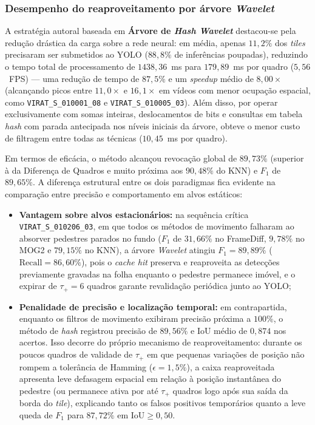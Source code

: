 \documentclass{ieeeaccess}
\begin{document}
\subsubsection{Desempenho do reaproveitamento por árvore \textit{Wavelet}}
A estratégia autoral baseada em \textbf{Árvore de \textit{Hash Wavelet}} destacou-se pela redução drástica da carga sobre a rede neural: em média, apenas $11{,}2\%$ dos \textit{tiles} precisaram ser submetidos ao YOLO ($88{,}8\%$ de inferências poupadas), reduzindo o tempo total de processamento de $1438{,}36$~ms para $179{,}89$~ms por quadro ($5{,}56$~FPS) --- uma redução de tempo de $87{,}5\%$ e um \textit{speedup} médio de $8{,}00\times$ (alcançando picos entre $11{,}0\times$ e $16{,}1\times$ em vídeos com menor ocupação espacial, como \texttt{VIRAT\_S\_010001\_08} e \texttt{VIRAT\_S\_010005\_03}). Além disso, por operar exclusivamente com somas inteiras, deslocamentos de bits e consultas em tabela \textit{hash} com parada antecipada nos níveis iniciais da árvore, obteve o menor custo de filtragem entre todas as técnicas ($10{,}45$~ms por quadro).

Em termos de eficácia, o método alcançou revocação global de $89{,}73\%$ (superior à da Diferença de Quadros e muito próxima aos $90{,}48\%$ do KNN) e $F_1$ de $89{,}65\%$. A diferença estrutural entre os dois paradigmas fica evidente na comparação entre precisão e comportamento em alvos estáticos:
\begin{itemize}
    \item \textbf{Vantagem sobre alvos estacionários:} na sequência crítica \texttt{VIRAT\_S\_010206\_03}, em que todos os métodos de movimento falharam ao absorver pedestres parados no fundo ($F_1$ de $31{,}66\%$ no FrameDiff, $9{,}78\%$ no MOG2 e $79{,}15\%$ no KNN), a árvore \textit{Wavelet} atingiu $F_1 = 89{,}89\%$ ($\mathrm{Recall} = 86{,}60\%$), pois o \textit{cache hit} preserva e reaproveita as detecções previamente gravadas na folha enquanto o pedestre permanece imóvel, e o expirar de $\tau_{+} = 6$ quadros garante revalidação periódica junto ao YOLO;
    \item \textbf{Penalidade de precisão e localização temporal:} em contrapartida, enquanto os filtros de movimento exibiram precisão próxima a $100\%$, o método de \textit{hash} registrou precisão de $89{,}56\%$ e $\mathrm{IoU}$ médio de $0{,}874$ nos acertos. Isso decorre do próprio mecanismo de reaproveitamento: durante os poucos quadros de validade de $\tau_{+}$ em que pequenas variações de posição não rompem a tolerância de Hamming ($\epsilon = 1{,}5\%$), a caixa reaproveitada apresenta leve defasagem espacial em relação à posição instantânea do pedestre (ou permanece ativa por até $\tau_{+}$ quadros logo após sua saída da borda do \textit{tile}), explicando tanto os falsos positivos temporários quanto a leve queda de $F_1$ para $87{,}72\%$ em $\mathrm{IoU} \ge 0{,}50$.
\end{itemize}
\end{document}
